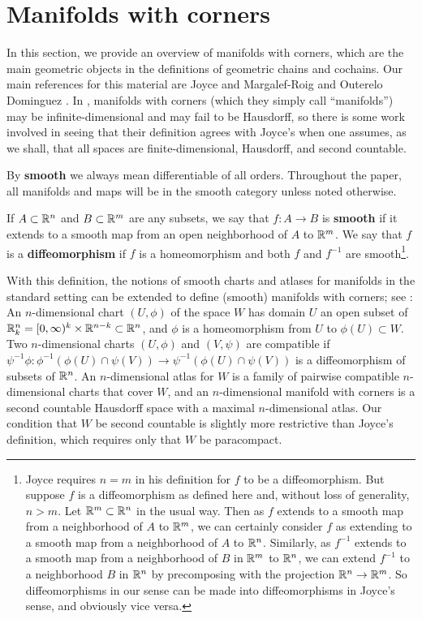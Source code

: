 
\section{Manifolds with corners}\label{S: manifolds with corners}

In this section, we provide an overview of manifolds with corners, which are the main geometric objects in the definitions of geometric chains and cochains.
Our main references for this material are Joyce \cite{Joy12} and Margalef-Roig and Outerelo Dominguez \cite{MaDo92}. In \cite{MaDo92}, manifolds with corners (which they simply call ``manifolds'') may be infinite-dimensional and may fail to be Hausdorff, so there is some work involved in seeing that their definition agrees with Joyce's when one assumes, as we shall, that all spaces are finite-dimensional, Hausdorff, and second countable. 

By \textbf{smooth} we always mean differentiable of all orders.
Throughout the paper, all manifolds and maps will be in the smooth category unless noted otherwise.

\begin{definition}\label{D: smooth}
	If $A \subset \mathbb{R}^n$ and $B \subset \mathbb{R}^m$ are any subsets, we say that $f \colon A \to B$ is \textbf{smooth} if it extends to a smooth map from an open neighborhood of $A$ to $\mathbb{R}^m$.
	We say that $f$ is a \textbf{diffeomorphism} if $f$ is a homeomorphism and both $f$ and $f^{-1}$ are smooth\footnote{Joyce requires $n = m$ in his definition for $f$ to be a diffeomorphism.
	But suppose $f$ is a diffeomorphism as defined here and, without loss of generality, $n>m$.
	Let $\mathbb{R}^m \subset \mathbb{R}^n$ in the usual way.
	Then as $f$ extends to a smooth map from a neighborhood of $A$ to $\mathbb{R}^m$, we can certainly consider $f$ as extending to a smooth map from a neighborhood of $A$ to $\mathbb{R}^n$.
	Similarly, as $f^{-1}$ extends to a smooth map from a neighborhood of $B$ in $\mathbb{R}^m$ to $\mathbb{R}^n$, we can extend $f^{-1}$ to a neighborhood $B$ in $\mathbb{R}^n$ by precomposing with the projection $\mathbb{R}^n \to \mathbb{R}^m$.
	So diffeomorphisms in our sense can be made into diffeomorphisms in Joyce's sense, and obviously vice versa.}.
\end{definition}

With this definition, the notions of smooth charts and atlases for manifolds in the standard setting can be extended to define (smooth) manifolds with corners; see \cite[Section 2]{Joy12}: An $n$-dimensional chart $(U,\phi)$ of the space $W$ has domain $U$ an open subset of $\mathbb{R}^n_k = [0,\infty)^k \times \mathbb{R}^{n-k} \subset \mathbb{R}^n$, and $\phi$ is a homeomorphism from $U$ to $\phi(U) \subset W$.
Two $n$-dimensional charts $(U,\phi)$ and $(V,\psi)$ are compatible if $\psi^{-1}\phi \colon \phi^{-1}(\phi(U) \cap \psi(V)) \to \psi^{-1}(\phi(U) \cap \psi(V))$ is a diffeomorphism of subsets of $\mathbb{R}^n$.
An $n$-dimensional atlas for $W$ is a family of pairwise compatible $n$-dimensional charts that cover $W$, and an $n$-dimensional manifold with corners is a second countable Hausdorff space with a maximal $n$-dimensional atlas.
Our condition that $W$ be second countable is slightly more restrictive than Joyce's definition, which requires only that $W$ be paracompact. 

